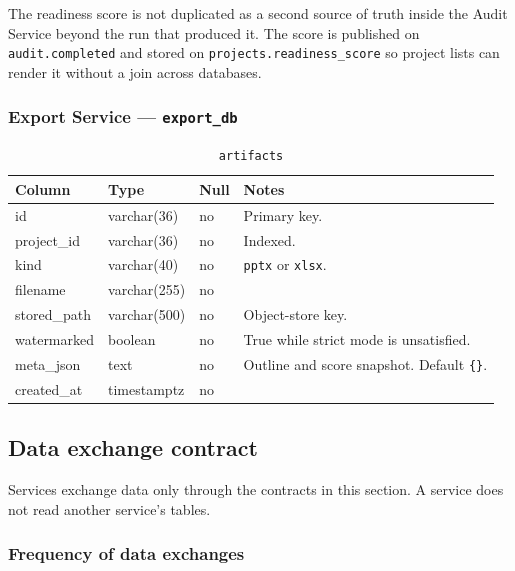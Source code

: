 \documentclass[11pt,a4paper]{article}
\begin{document}
The readiness score is not duplicated as a second source of truth inside the Audit Service beyond the run that produced it. The score is published on \texttt{audit.completed} and stored on \texttt{projects.readiness\_score} so project lists can render it without a join across databases.

\subsubsection{Export Service --- \texttt{export\_db}}

\begin{table}[ht]
\centering
\caption{\texttt{artifacts}}
\small
\begin{tabular}{@{}llll@{}}
\toprule
\textbf{Column} & \textbf{Type} & \textbf{Null} & \textbf{Notes} \\
\midrule
id & varchar(36) & no & Primary key. \\
project\_id & varchar(36) & no & Indexed. \\
kind & varchar(40) & no & \texttt{pptx} or \texttt{xlsx}. \\
filename & varchar(255) & no & \\
stored\_path & varchar(500) & no & Object-store key. \\
watermarked & boolean & no & True while strict mode is unsatisfied. \\
meta\_json & text & no & Outline and score snapshot. Default \texttt{\{\}}. \\
created\_at & timestamptz & no & \\
\bottomrule
\end{tabular}
\end{table}

\subsection{Data exchange contract}

Services exchange data only through the contracts in this section. A service does not read another service's tables.

\subsubsection{Frequency of data exchanges}
\end{document}
